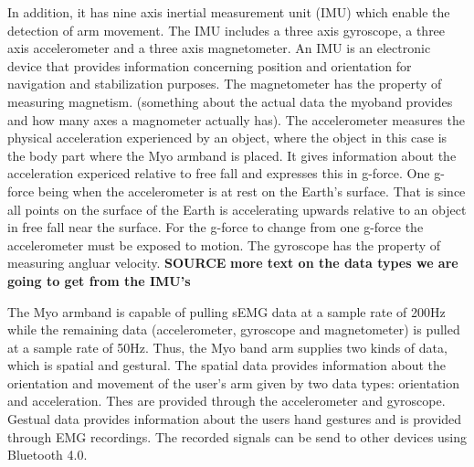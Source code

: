 In addition, it has nine axis inertial measurement unit (IMU) which enable the detection of arm movement. The IMU includes a three axis gyroscope, a three axis accelerometer and a three axis magnetometer. An IMU is an electronic device that provides information concerning position and orientation for navigation and stabilization purposes. The magnetometer has the property of measuring magnetism. (something about the actual data the myoband provides and how many axes a magnometer actually has). The accelerometer measures the physical acceleration experienced by an object, where the object in this case is the body part where the Myo armband is placed. It gives information about the acceleration expericed relative to free fall and expresses this in g-force. One g-force being when the accelerometer is at rest on the Earth's surface. That is since all points on the surface of the Earth is accelerating upwards relative to an object in free fall near the surface. For the g-force to change from one g-force the accelerometer must be exposed to motion. The gyroscope has the property of measuring angluar velocity. \textbf{SOURCE}
\textbf{more text on the data types we are going to get from the IMU's} 


The Myo armband is capable of pulling sEMG data at a sample rate of 200Hz while the remaining data (accelerometer, gyroscope and magnetometer) is pulled at a sample rate of  50Hz. 
Thus, the Myo band arm supplies two kinds of data, which is spatial and gestural. The spatial data provides information about the orientation and movement of the user's arm given by two data types: orientation and acceleration. Thes are provided through the accelerometer and gyroscope. Gestual data provides information about the users hand gestures and is provided through EMG recordings. The recorded signals can be send to other devices using Bluetooth 4.0.







